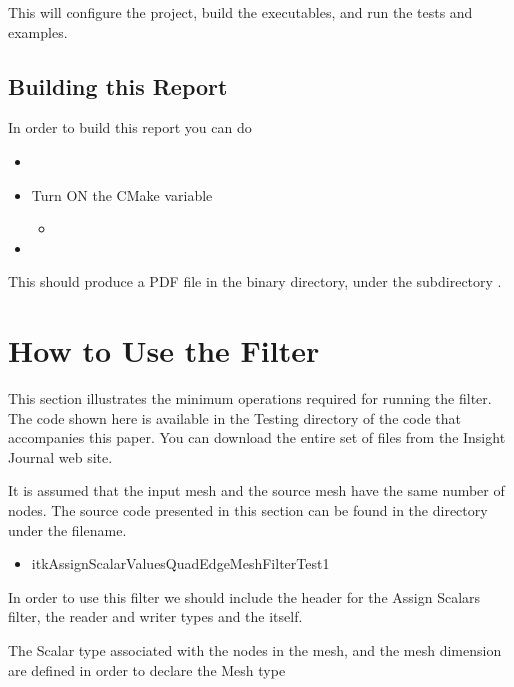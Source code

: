 \documentclass{InsightArticle}
\begin{document}
This will configure the project, build the executables, and run the tests and
examples. 


\subsection{Building this Report}

In order to build this report you can do

\begin{itemize}
\item {}
\item Turn ON the CMake variable
\begin{itemize}
\item {}
\end{itemize}
\item {}
\end{itemize}

This should produce a PDF file in the binary directory, under the subdirectory
.

\section{How to Use the Filter}

This section illustrates the minimum operations required for running the filter. The code shown here 
is available in the Testing directory of the code that accompanies this paper. You can download the 
entire set of files from the Insight Journal web site.

It is assumed that the input mesh and the source mesh have the same number of nodes. The source
code presented in this section can be found in the  directory under the filename.

\begin{itemize}
\item itkAssignScalarValuesQuadEdgeMeshFilterTest1
\end{itemize}

In order to use this filter we should include the header for the Assign Scalars filter, the reader and writer
types and the  itself.

\begin{center}

\end{center}

The Scalar type associated with the nodes in the mesh, and the mesh dimension
are defined in order to declare the Mesh type
\end{document}
